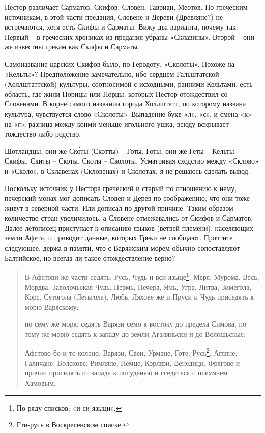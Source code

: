 Нестор различает Сарматов, Скифов, Словен, Тавриан, Меотов. По греческим источникам, в этой части предания, Словене и Дереви (Древляне?) не встречаются, хотя есть Скифы и Сарматы. Вижу два варианта, почему так. Первый – в греческих хрониках из предания убраны «Склавины». Второй – они же известны грекам как Скифы и Сарматы.

Самоназвание царских Скифов было, по Геродоту, «Сколоты». Похоже на «Кельты»? Предположение замечательно, ибо сердцем Гальштатской (Холлштаттской) культуры, соотносимой с исходными, ранними Кельтами, есть область, где жили Норицы или Норцы, которых Нестор отождествил со Словенами. В корне самого названии города Холлштатт, по которому названа культура, чувствуется слово «Сколоты». Выпадение букв «л», «с», и смена «к» на «г», разница между коими меньше игольного ушка, всюду вскрывает тождество либо родство.

Шотландцы, они же Ск\'оты (Скотты) – Готы. Готы, они же Геты – Кельты. Скифы, Скиты – Скоты. Скоты – Сколоты. Усматривая сходство между «Склово» и «Сколо», в Склавенах (Скловенах) и Сколотах, я не решаюсь сделать вывод.

Поскольку источник у Нестора греческий и старый по отношению к нему, печерский монах мог дописать Словен и Дерев по соображению, что они тоже живут в северной части. Или дописал по другой причине. Таким образом количество стран увеличилось, а Словене отмежевались от Скифов и Сарматов. Далее летописец приступает к описанию языков (ветвей племени), населяющих земли Афета, и приводит данные, которых Греки не сообщают. Прочтите следующее, держа в памяти, что с Варяжским морем обычно сопоставляют Балтийское, но всегда ли такое отождествление верно?
 
\begin{quotation}
В Афетови же части седять: Русь, Чудь и вси языце\footnote{По ряду списков: «и си языци».}, Меря, Мурома, Весь, Мордва, Заволочьская Чудь, Пермь, Печера, Ямь, Угра, Литва, Зимегола, Корс, Сетогола (Летьгола), Любь. Ляхове же и Пруси и Чудь приседять к морю Варяскому;

по сему же морю седять Варязи семо к востоку до предела Симова, по тому же морю седять к западу до земли Агаляньски и до Волошьскые.

Афетово бо и то колено: Варязи, Свеи, Урмане, Готе, Русь\footnote{Гти-русь в Воскресенском списке.}, Агляне, Галичане, Волохове, Римляне, Немце, Корлязи, Венедици, Фрягове и прочии приседять от запада к полуденью и сседяться с племянем Хамовым.
\end{quotation}


